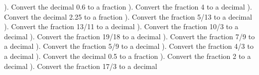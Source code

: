 \documentclass{article}%
\begin{document}
\newline%
). Convert the decimal 0.6 to a fraction%
\newline%
\newline%
). Convert the fraction 4 to a decimal%
\newline%
\newline%
). Convert the decimal 2.25 to a fraction%
\newline%
\newline%
). Convert the fraction 5/13 to a decimal%
\newline%
\newline%
). Convert the fraction 13/11 to a decimal%
\newline%
\newline%
). Convert the fraction 10/3 to a decimal%
\newline%
\newline%
). Convert the fraction 19/18 to a decimal%
\newline%
\newline%
). Convert the fraction 7/9 to a decimal%
\newline%
\newline%
). Convert the fraction 5/9 to a decimal%
\newline%
\newline%
). Convert the fraction 4/3 to a decimal%
\newline%
\newline%
). Convert the decimal 0.5 to a fraction%
\newline%
\newline%
). Convert the fraction 2 to a decimal%
\newline%
\newline%
). Convert the fraction 17/3 to a decimal%
\newline%
\newline%
\newline%
\end{document}
